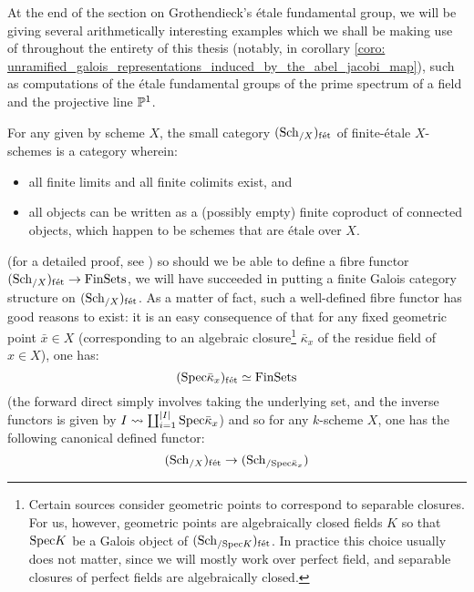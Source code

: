             At the end of the section on Grothendieck's \'etale fundamental group, we will be giving several arithmetically interesting examples which we shall be making use of throughout the entirety of this thesis (notably, in corollary \ref{coro: unramified_galois_representations_induced_by_the_abel_jacobi_map}), such as computations of the \'etale fundamental groups of the prime spectrum of a field and the projective line $\P^1$.
            \begin{remark} \label{remark: finite_etale_schemes}
                For any given by scheme $X$, the small category $(\Sch_{/X})_{\fet}$ of finite-\'etale $X$-schemes is a category wherein:
                    \begin{itemize}
                        \item all finite limits and all finite colimits exist, and
                        \item all objects can be written as a (possibly empty) finite coproduct of connected objects, which happen to be schemes that are \'etale over $X$.  
                    \end{itemize}
                (for a detailed proof, see \cite[\href{https://stacks.math.columbia.edu/tag/0BN9}{Tag 0BN9}]{stacks}) so should we be able to define a fibre functor $(\Sch_{/X})_{\fet} \to \Fin\Sets$, we will have succeeded in putting a finite Galois category structure on $(\Sch_{/X})_{\fet}$. As a matter of fact, such a well-defined fibre functor has good reasons to exist: it is an easy consequence of \cite[\href{https://stacks.math.columbia.edu/tag/00U3}{Tag 00U3}]{stacks} that for any fixed geometric point $\bar{x} \in X$ (corresponding to an algebraic closure\footnote{Certain sources consider geometric points to correspond to separable closures. For us, however, geometric points are algebraically closed fields $K$ so that $\Spec K$ be a Galois object of $(\Sch_{/\Spec K})_{\fet}$. In practice this choice usually does not matter, since we will mostly work over perfect field, and separable closures of perfect fields are algebraically closed.} $\bar{\kappa}_x$ of the residue field of $x \in X$), one has:
                    $$(\Spec \bar{\kappa}_x)_{\fet} \cong \Fin\Sets$$
                (the forward direct simply involves taking the underlying set, and the inverse functors is given by $I \mapsto \coprod_{i = 1}^{|I|} \Spec \bar{\kappa}_x$) and so for any $k$-scheme $X$, one has the following canonical defined functor:
                    $$(\Sch_{/X})_{\fet} \to (\Sch_{/\Spec \bar{\kappa}_x})$$

\end{remark}
